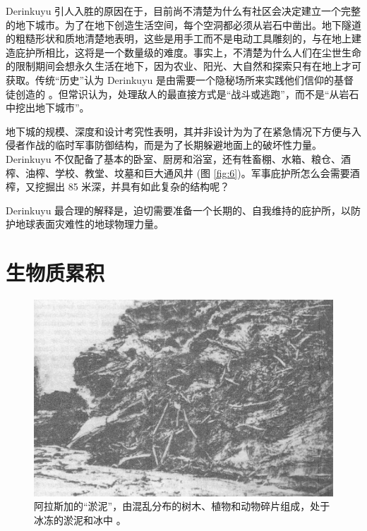 \documentclass[10pt,twocolumn,letterpaper]{article}
\begin{document}
Derinkuyu 引人入胜的原因在于，目前尚不清楚为什么有社区会决定建立一个完整的地下城市。为了在地下创造生活空间，每个空洞都必须从岩石中凿出。地下隧道的粗糙形状和质地清楚地表明，这些是用手工而不是电动工具雕刻的，与在地上建造庇护所相比，这将是一个数量级的难度。事实上，不清楚为什么人们在尘世生命的限制期间会想永久生活在地下，因为农业、阳光、大自然和探索只有在地上才可获取。传统“历史”认为 Derinkuyu 是由需要一个隐秘场所来实践他们信仰的基督徒创造的 \cite{53}。但常识认为，处理敌人的最直接方式是“战斗或逃跑”，而不是“从岩石中挖出地下城市”。

地下城的规模、深度和设计考究性表明，其并非设计为为了在紧急情况下方便与入侵者作战的临时军事防御结构，而是为了长期躲避地面上的破坏性力量。Derinkuyu 不仅配备了基本的卧室、厨房和浴室，还有牲畜棚、水箱、粮仓、酒榨、油榨、学校、教堂、坟墓和巨大通风井 (图 \ref{fig:6})。军事庇护所怎么会需要酒榨，又挖掘出 85 米深，并具有如此复杂的结构呢？

Derinkuyu 最合理的解释是，迫切需要准备一个长期的、自我维持的庇护所，以防护地球表面灾难性的地球物理力量。

\section{生物质累积}

\begin{figure}[t]
\begin{center}
   \includegraphics[width=1\linewidth]{muck-crop.jpeg}
\end{center}
   \caption{阿拉斯加的“淤泥”，由混乱分布的树木、植物和动物碎片组成，处于冰冻的淤泥和冰中 \cite{146}。}
\label{fig:7}
\label{fig:onecol}
\end{figure}
\end{document}
